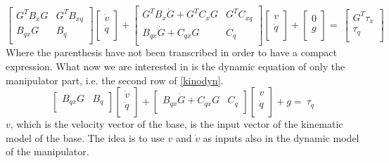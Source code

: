 \begin{equation} \label{kinodyn}
	\left[\begin{matrix}G^TB_xG&G^TB_{xq}\\B_{qx}G&B_q\\\end{matrix}\right]\left[\begin{matrix}\dot{v}\\\ddot{q}\\\end{matrix}\right]+\left[\begin{matrix}G^TB_x\dot{G}+G^TC_xG&G^TC_{xq}\\B_{qx}\dot{G}+C_{qx}G&C_q\\\end{matrix}\right]\left[\begin{matrix}v\\\dot{q}\\\end{matrix}\right]+\left[\begin{matrix}0\\g\\\end{matrix}\right]=\ \left[\begin{matrix}G^T\tau_x\\\tau_q\\\end{matrix}\right]
\end{equation}
Where the parenthesis have not been transcribed in order to have a compact expression.
What now we are interested in is the dynamic equation of only the manipulator part, i.e. the second row of \ref{kinodyn}.
\begin{equation}
	\left[\begin{matrix}B_{qx}G&B_q\\\end{matrix}\right]\left[\begin{matrix}\dot{v}\\\ddot{q}\\\end{matrix}\right]+\left[\begin{matrix}B_{qx}\dot{G}+C_{qx}G&C_q\\\end{matrix}\right]\left[\begin{matrix}v\\\dot{q}\\\end{matrix}\right]+g=\ \tau_q
\end{equation}
$v$, which is the velocity vector of the base, is the input vector of the kinematic model of the base. The idea is to use $v$ and $\dot{v}$ as inputs also in the dynamic model of the manipulator. 
